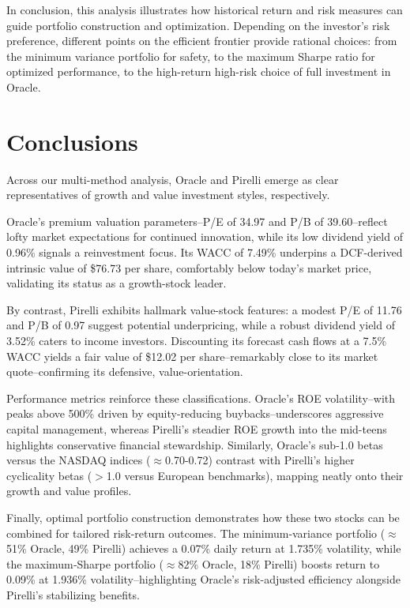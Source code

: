 \documentclass[12pt,a4paper]{report}
\begin{document}
In conclusion, this analysis illustrates how historical return and risk measures can guide portfolio construction and optimization. Depending on the investor's risk preference, different points on the efficient frontier provide rational choices: from the minimum variance portfolio for safety, to the maximum Sharpe ratio for optimized performance, to the high-return high-risk choice of full investment in Oracle. 



\chapter{Conclusions}
Across our multi-method analysis, Oracle and Pirelli emerge as clear representatives of growth and value investment styles, respectively.  

Oracle’s premium valuation parameters--P/E of 34.97 and P/B of 39.60--reflect lofty market expectations for continued innovation, while its low dividend yield of 0.96\% signals a reinvestment focus.  Its WACC of 7.49\% underpins a DCF-derived intrinsic value of \$76.73 per share, comfortably below today’s market price, validating its status as a growth-stock leader.  

By contrast, Pirelli exhibits hallmark value-stock features: a modest P/E of 11.76 and P/B of 0.97 suggest potential underpricing, while a robust dividend yield of 3.52\% caters to income investors.  Discounting its forecast cash flows at a 7.5\% WACC yields a fair value of \$12.02 per share--remarkably close to its market quote--confirming its defensive, value-orientation.  

Performance metrics reinforce these classifications.  Oracle’s ROE volatility--with peaks above 500\% driven by equity-reducing buybacks--underscores aggressive capital management, whereas Pirelli’s steadier ROE growth into the mid-teens highlights conservative financial stewardship.  Similarly, Oracle’s sub-1.0 betas versus the NASDAQ indices ($\approx$0.70-0.72) contrast with Pirelli’s higher cyclicality betas ($>$1.0 versus European benchmarks), mapping neatly onto their growth and value profiles.  

Finally, optimal portfolio construction demonstrates how these two stocks can be combined for tailored risk-return outcomes.  The minimum‐variance portfolio ($\approx$51\% Oracle, 49\% Pirelli) achieves a 0.07\% daily return at 1.735\% volatility, while the maximum‐Sharpe portfolio ($\approx$82\% Oracle, 18\% Pirelli) boosts return to 0.09\% at 1.936\% volatility--highlighting Oracle’s risk-adjusted efficiency alongside Pirelli’s stabilizing benefits.  
\end{document}
